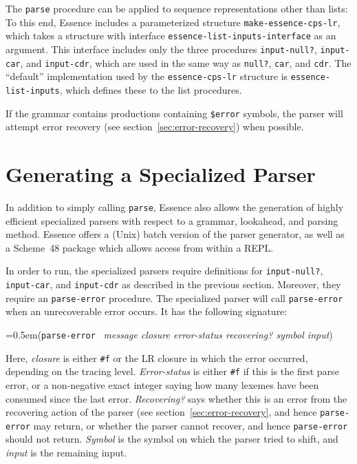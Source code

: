 \documentclass{article}
\newcommand{\var}[1]{\textit{#1}}
\newcommand{\pproto}[2]{\noindent%
{\texonly\spaceskip=0.5em\endtexonly{}#1}%
~\nobreak\textrm{#2}}
\newcommand{\proto}[3]{\par\bigskip\begin{flushleft}\pproto{(\texttt{#1}}{\textit{#2})}\hspace*{\fill}{#3}\end{flushleft}}
\newcommand{\codefont}[1]{\texttt{#1}}
\begin{document}
The \codefont{parse} procedure can be applied to sequence
representations other than lists: To this end, Essence includes a
parameterized structure \codefont{make-essence-cps-lr}, which takes a
structure with interface \codefont{essence-list-inputs-interface} as
an argument.  This interface includes only the three procedures
\codefont{input-null?}, \codefont{input-car}, and
\codefont{input-cdr}, which are used in the same way as
\codefont{null?}, \codefont{car}, and \codefont{cdr}.   The
``default'' implementation used by the \codefont{essence-cps-lr} structure
is \codefont{essence-list-inputs}, which defines these to the list
procedures.

If the grammar contains productions containing \codefont{\$error}
symbols, the parser will attempt error recovery (see
section~\ref{sec:error-recovery}) when possible.

\section{Generating a Specialized Parser}
\label{sec:parser-generation}

In addition to simply calling \codefont{parse}, Essence also allows
the generation of highly efficient specialized parsers with respect to
a grammar, lookahead, and parsing method.  Essence offers a (Unix)
batch version of the parser generator, as well as a Scheme~48 package
which allows access from within a REPL.

In order to run, the specialized parsers require definitions for
\codefont{input-null?}, \codefont{input-car}, and \codefont{input-cdr}
as described in the previous section.  Moreover, they require an
\codefont{parse-error} procedure.  The specialized parser will call
\codefont{parse-error} when an unrecoverable error occurs.  It has the
following signature:

\proto{parse-error}{message closure error-status recovering? symbol input}{procedure}
%
Here, \var{closure} is either \verb|#f| or the LR closure in which the
error occurred, depending on the tracing level.  \var{Error-status} is
either \verb|#f| if this is the first parse error, or a non-negative
exact integer saying how many lexemes have been consumed since the
last error.  \var{Recovering?} says whether this is an error from the
recovering action of the parser (see section~\ref{sec:error-recovery},
and hence \codefont{parse-error} may return, or whether the parser
cannot recover, and hence \codefont{parse-error} should not return.
\var{Symbol} is the symbol on which the parser tried to shift, and
\var{input} is the remaining input.
\end{document}
